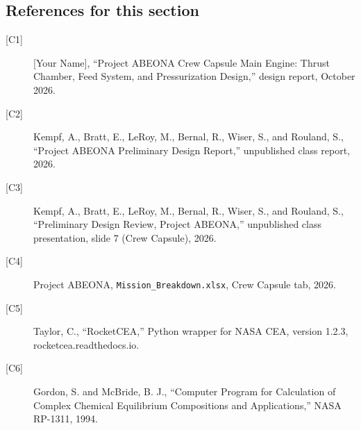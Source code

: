 \subsection*{References for this section}
{\small\begin{description}
\item[{[C1]}] [Your Name], ``Project ABEONA Crew Capsule Main Engine: Thrust Chamber, Feed System, and Pressurization Design,'' design report, October 2026.
\item[{[C2]}] Kempf, A., Bratt, E., LeRoy, M., Bernal, R., Wiser, S., and Rouland, S., ``Project ABEONA Preliminary Design Report,'' unpublished class report, 2026.
\item[{[C3]}] Kempf, A., Bratt, E., LeRoy, M., Bernal, R., Wiser, S., and Rouland, S., ``Preliminary Design Review, Project ABEONA,'' unpublished class presentation, slide 7 (Crew Capsule), 2026.
\item[{[C4]}] Project ABEONA, \texttt{Mission\_Breakdown.xlsx}, Crew Capsule tab, 2026.
\item[{[C5]}] Taylor, C., ``RocketCEA,'' Python wrapper for NASA CEA, version 1.2.3, rocketcea.readthedocs.io.
\item[{[C6]}] Gordon, S. and McBride, B. J., ``Computer Program for Calculation of Complex Chemical Equilibrium Compositions and Applications,'' NASA RP-1311, 1994.
\end{description}}
